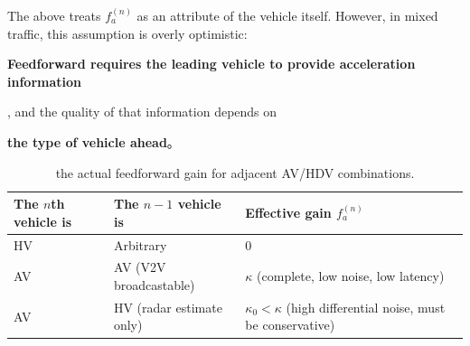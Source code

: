 \documentclass[11pt,a4paper,openany]{book}
\numberwithin{equation}{chapter}
\numberwithin{figure}{chapter}
\numberwithin{table}{chapter}
\begin{document}
\label{sub:mixed}




The above treats $f_a^{(n)}$ as an attribute of the vehicle itself. However, in mixed traffic, this assumption is overly optimistic:




\textbf{Feedforward requires the leading vehicle to provide acceleration information}




, and the quality of that information depends on




\textbf{the type of vehicle ahead}。

\begin{table}[htbp]
\centering
\small
\caption{the actual feedforward gain for adjacent AV/HDV combinations.}
\label{tab:pair-dependent-gain}
\begin{tabular}{p{4.4cm}p{4.4cm}p{4.6cm}}
\toprule







The $n$th vehicle is& The $n-1$ vehicle is




&




 Effective gain $f_a^{(n)}$



\\
\midrule
HV &




 Arbitrary




& $0$ \\
AV &




 AV (V2V broadcastable)




&




 $\kappa$ (complete, low noise, low latency)



\\
AV &




 HV (radar estimate only)




&




 $\kappa_0<\kappa$ (high differential noise, must be conservative)



\\
\bottomrule
\end{tabular}
\end{table}
\end{document}
